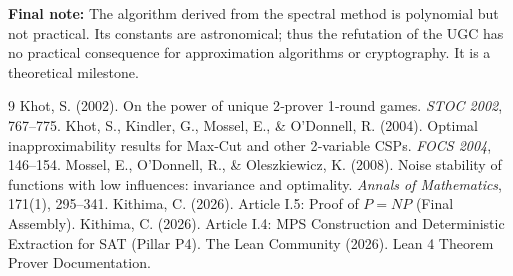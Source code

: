 \documentclass[11pt,a4paper]{article}
\begin{document}
\vspace{0.5cm}
\noindent\textbf{Final note:} The algorithm derived from the spectral method is polynomial but not practical. Its constants are astronomical; thus the refutation of the UGC has no practical consequence for approximation algorithms or cryptography. It is a theoretical milestone.


\begin{thebibliography}{9}
  Khot, S. (2002). On the power of unique 2‑prover 1‑round games. \emph{STOC 2002}, 767–775.
  Khot, S., Kindler, G., Mossel, E., \& O’Donnell, R. (2004). Optimal inapproximability results for Max‑Cut and other 2‑variable CSPs. \emph{FOCS 2004}, 146–154.
  Mossel, E., O’Donnell, R., \& Oleszkiewicz, K. (2008). Noise stability of functions with low influences: invariance and optimality. \emph{Annals of Mathematics}, 171(1), 295–341.
  Kithima, C. (2026). Article I.5: Proof of $P = NP$ (Final Assembly).
  Kithima, C. (2026). Article I.4: MPS Construction and Deterministic Extraction for SAT (Pillar P4).
  The Lean Community (2026). Lean 4 Theorem Prover Documentation.
\end{thebibliography}
\end{document}
